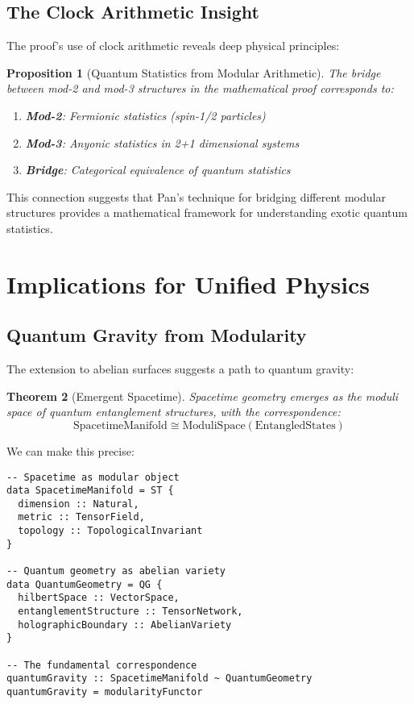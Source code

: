 \documentclass[12pt,a4paper]{article}
\newtheorem{theorem}{Theorem}[section]
\newtheorem{proposition}[theorem]{Proposition}
\begin{document}
\subsection{The Clock Arithmetic Insight}

The proof's use of clock arithmetic reveals deep physical principles:

\begin{proposition}[Quantum Statistics from Modular Arithmetic]
The bridge between mod-2 and mod-3 structures in the mathematical proof corresponds to:
\begin{enumerate}
\item \textbf{Mod-2}: Fermionic statistics (spin-1/2 particles)
\item \textbf{Mod-3}: Anyonic statistics in 2+1 dimensional systems
\item \textbf{Bridge}: Categorical equivalence of quantum statistics
\end{enumerate}
\end{proposition}

This connection suggests that Pan's technique for bridging different modular structures provides a mathematical framework for understanding exotic quantum statistics.

\section{Implications for Unified Physics}

\subsection{Quantum Gravity from Modularity}

The extension to abelian surfaces suggests a path to quantum gravity:

\begin{theorem}[Emergent Spacetime]
Spacetime geometry emerges as the moduli space of quantum entanglement structures, with the correspondence:
\[
\text{SpacetimeManifold} \cong \text{ModuliSpace}(\text{EntangledStates})
\]
\end{theorem}

We can make this precise:

\begin{lstlisting}[style=haskell]
-- Spacetime as modular object
data SpacetimeManifold = ST {
  dimension :: Natural,
  metric :: TensorField,
  topology :: TopologicalInvariant
}

-- Quantum geometry as abelian variety
data QuantumGeometry = QG {
  hilbertSpace :: VectorSpace,
  entanglementStructure :: TensorNetwork,
  holographicBoundary :: AbelianVariety
}

-- The fundamental correspondence
quantumGravity :: SpacetimeManifold ~ QuantumGeometry
quantumGravity = modularityFunctor
\end{lstlisting}
\end{document}
